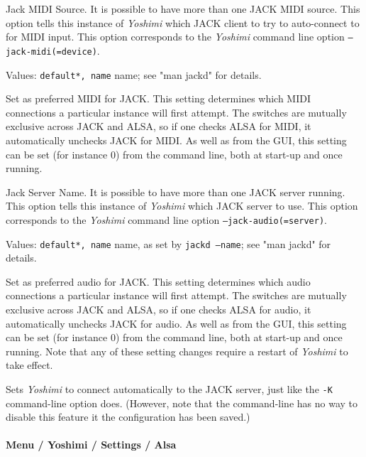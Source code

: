    \setcounter{ItemCounter}{0}      %

   Jack MIDI Source.
   It is possible to have more than one JACK MIDI source.  This option
   tells this instance of \textsl{Yoshimi} which JACK
   client to try to auto-connect to for MIDI input.
   This option corresponds to the \textsl{Yoshimi} command line option
   \texttt{--jack-midi(=device)}.

   Values: \texttt{default*, name} name; see "man jackd" for details.

   Set as preferred MIDI for JACK.
   This setting determines which MIDI connections a particular instance will
   first attempt. The switches are mutually exclusive across JACK and ALSA,
   so if one checks ALSA for MIDI, it automatically unchecks JACK for MIDI.
   As well as from the GUI, this setting can be set (for instance 0) from the
   command line, both at start-up and once running.

   Jack Server Name.
   It is possible to have more than one JACK server running.  This option
   tells this instance of \textsl{Yoshimi} which JACK server to use.
   This option corresponds to the \textsl{Yoshimi} command line option
   \texttt{--jack-audio(=server)}.

   Values: \texttt{default*, name} name, as set by
   \texttt{jackd --name}; see "man jackd" for details.

   Set as preferred audio for JACK.
   This setting determines which audio connections a particular instance will
   first attempt. The switches are mutually exclusive across JACK and ALSA,
   so if one checks ALSA for audio, it automatically unchecks JACK for audio.
   As well as from the GUI, this setting can be set (for instance 0) from the
   command line, both at start-up and once running.
   Note that any of these setting changes require a restart of \textsl{Yoshimi}
   to take effect.

   Sets \textsl{Yoshimi} to connect automatically to the JACK server, just like
   the \texttt{-K} command-line option does.
   (However, note that the command-line has no way to disable this feature it
   the configuration has been saved.)

\paragraph{Menu / Yoshimi / Settings / Alsa}
\label{paragraph:menu_yoshimi_settings_alsa_tab}

